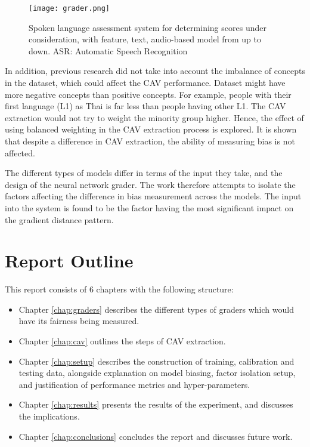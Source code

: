 \begin{figure}[H]
    \centering
    \texttt{[image: grader.png]}
    \caption{Spoken language assessment system for determining scores under consideration, with feature, text, audio-based model from up to down. ASR: Automatic Speech Recognition}
    \label{fig:grader}
\end{figure}


In addition, previous research did not take into account the imbalance of concepts in the dataset, which could affect the CAV performance. Dataset might have more negative concepts than positive concepts. For example, people with their first language (L1)  as Thai is far less than people having other L1. The CAV extraction would not try to weight the minority group higher. Hence, the effect of using balanced weighting in the CAV extraction process is explored. It is shown that despite a difference in CAV extraction, the ability of measuring bias is not affected.

The different types of models differ in terms of the input they take, and the design of the neural network grader. The work therefore attempts to isolate the factors affecting the difference in bias measurement across the models. The input into the system is found to be the factor having the most significant impact on the gradient distance pattern.

\section{Report Outline}
This report consists of 6 chapters with the following structure:
\begin{itemize}
    \item Chapter \ref{chap:graders} describes the different types of graders which would have its fairness being measured.
    \item Chapter \ref{chap:cav} outlines the steps of CAV extraction.
    \item Chapter \ref{chap:setup} describes the construction of training, calibration and testing data, alongside explanation on model biasing, factor isolation setup, and justification of performance metrics and hyper-parameters.
    \item Chapter \ref{chap:results} presents the results of the experiment, and discusses the implications.
    \item Chapter \ref{chap:conclusions} concludes the report and discusses future work.
\end{itemize}
